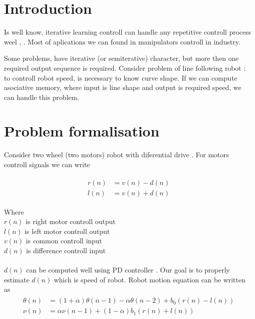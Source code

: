 \documentclass[twoside]{oss-conf-eng}
\begin{document}

\section*{Introduction}

Is well know, iterative learning controll can handle any repetitive controll
process weel \cite{ilc1}, \cite{ilc2}. Most of aplications we can found in manipulators
controll in industry.

Some problems, have iterative (or semiterative) character, but more then one required
output sequence is required. Consider problem of line following robot : to controll robot
speed, is necessary to know curve shape. If we can compute asociative memory, where input is
line shape and output is required speed, we can handle this problem.

\section{Problem formalisation}

Consider two wheel (two motors) robot with diferential drive \cite{robot_model_1}. For motors
controll signals we can write

\begin{eqnarray}
\begin{split}
\label{robot_equation}
	r(n) &=	v(n) - d(n) \\
    l(n) &=	v(n) + d(n)
\end{split}
\end{eqnarray}

Where \\
$r(n)$ is right motor controll output \\
$l(n)$ is left motor controll output \\
$v(n)$ is common controll input \\
$d(n)$ is difference controll input \\
\\
$d(n)$ can be computed well using PD controller \cite{servo_pd}. Our goal
is to properly estimate $d(n)$ which is speed of robot.
Robot motion equation can be written as
\begin{eqnarray}
\begin{split}
\label{robot_equation}
	\theta(n) &= (1 + \alpha) \theta(n-1) - \alpha \theta(n-2) + b_0 (r(n) - l(n))  \\
    \nu(n) &=  \alpha \nu(n-1) + (1 - \alpha) b_1 (r(n) + l(n))
\end{split}
\end{eqnarray}
\end{document}
